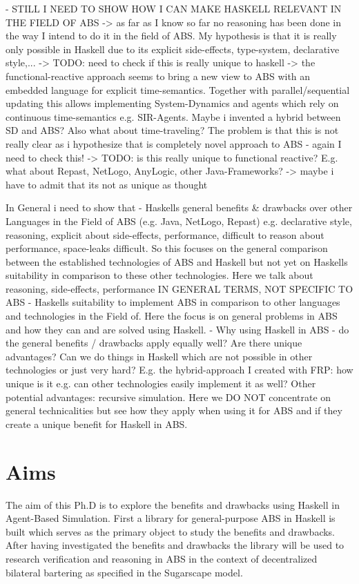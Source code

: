 - STILL I NEED TO SHOW HOW I CAN MAKE HASKELL RELEVANT IN THE FIELD OF ABS
	-> as far as I know so far no reasoning has been done in the way I intend to do it in the field of ABS. My hypothesis is that it is really only possible in Haskell due to its explicit side-effects, type-system, declarative style,... 
		-> TODO: need to check if this is really unique to haskell
	-> the functional-reactive approach seems to bring a new view to ABS with an embedded language for explicit time-semantics. Together with parallel/sequential updating this allows implementing System-Dynamics and agents which rely on continuous time-semantics e.g. SIR-Agents. Maybe i invented a hybrid between SD and ABS? Also what about time-traveling? The problem is that this is not really clear as i hypothesize that is completely novel approach to ABS - again I need to check this!
		-> TODO: is this really unique to functional reactive? E.g. what about Repast, NetLogo, AnyLogic, other Java-Frameworks? 
	-> maybe i have to admit that its not as unique as thought

In General i need to show that
- Haskells general benefits \& drawbacks over other Languages in the Field of ABS (e.g. Java, NetLogo, Repast) e.g. declarative style, reasoning, explicit about side-effects, performance, difficult to reason about performance, space-leaks difficult. So this focuses on the general comparison between the established technologies of ABS and Haskell but not yet on Haskells suitability in comparison to these other technologies. Here we talk about reasoning, side-effects, performance IN GENERAL TERMS, NOT SPECIFIC TO ABS
- Haskells suitability to implement ABS in comparison to other languages and technologies in the Field of. Here the focus is on general problems in ABS and how they can and are solved using Haskell.
- Why using Haskell in ABS - do the general benefits / drawbacks apply equally well? Are there unique advantages? Can we do things in Haskell which are not possible in other technologies or just very hard? E.g. the hybrid-approach I created with FRP: how unique is it e.g. can other technologies easily implement it as well? Other potential advantages: recursive simulation. Here we DO NOT concentrate on general technicalities but see how they apply when using it for ABS and if they create a unique benefit for Haskell in ABS.

\section{Aims}
The aim of this Ph.D is to explore the benefits and drawbacks using Haskell in  Agent-Based Simulation. First a library for general-purpose ABS in Haskell is built which serves as the primary object to study the benefits and drawbacks. After having investigated the benefits and drawbacks the library will be used to research  verification and reasoning in ABS in the context of decentralized bilateral bartering as specified in the Sugarscape model.

